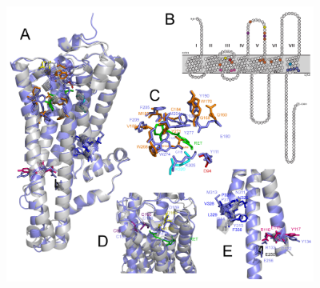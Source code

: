 \begin{figure}[hb]
  \centering
  \includegraphics[width=4in]{./Chapter_RhodStruct/img/SpStructure.png}

\end{figure}
